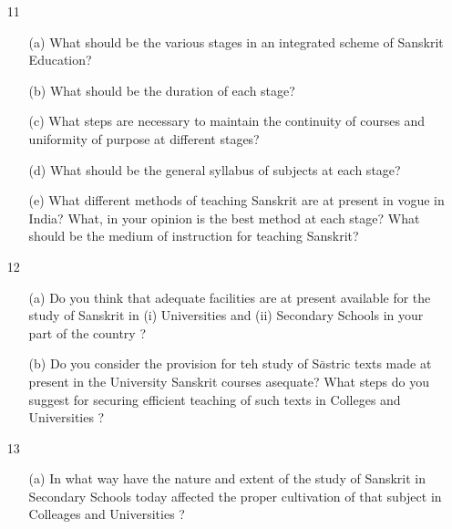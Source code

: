 {\rm 
\begin{itemize}
\item[11] \begin{itemize}
           \item[(a)] What should be the various stages in an integrated scheme of Sanskrit Education?
           
           \item[(b)] What should be the duration of each stage?
           
           \item[(c)] What steps are necessary to maintain the continuity of courses and uniformity of purpose at different stages?
           
           \item[(d)] What should be the general syllabus of subjects at each stage?
           
           \item[(e)] What different methods of teaching Sanskrit are at present in vogue in India? What, in your opinion is the best method at each stage? What should be the medium of instruction for teaching  Sanskrit?
          \end{itemize}
   
   
   \item[12] \begin{itemize}
              
              \item[(a)] Do you think that adequate facilities are at present available for the study of Sanskrit in (i) Universities and (ii) Secondary Schools in your part of the country ?
              
              \item[(b)] Do you consider the provision for teh study of S$\bar{a}$stric texts made at present in the University Sanskrit courses asequate? What steps do you suggest for securing efficient teaching of such texts in Colleges and Universities ?
              \end{itemize}
              
    \item[13] \begin{itemize}
    
               \item[(a)] In what way have the nature and extent of the study of Sanskrit in Secondary Schools today affected the proper cultivation of that subject in Colleages and Universities ?
               

\end{itemize}
\end{itemize}}
